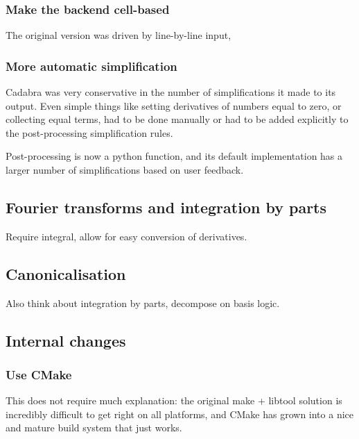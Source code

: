 \documentclass[11pt]{article}
\begin{document}
\subsubsection{Make the backend cell-based}

The original version was driven by line-by-line input, 

\subsubsection{More automatic simplification}

Cadabra was very conservative in the number of simplifications it made
to its output. Even simple things like setting derivatives of
numbers equal to zero, or collecting equal terms, had to be done
manually or had to be added explicitly to the post-processing
simplification rules.

Post-processing is now a python function, and its default
implementation has a larger number of simplifications based on user
feedback. 


\subsection{Fourier transforms and integration by parts}

Require integral, allow for easy conversion of derivatives.

\subsection{Canonicalisation}

Also think about integration by parts, decompose on basis logic.


\subsection{Internal changes}
\subsubsection{Use CMake}

This does not require much explanation: the original make + libtool
solution is incredibly difficult to get right on all platforms, and
CMake has grown into a nice and mature build system that just works.
\end{document}
